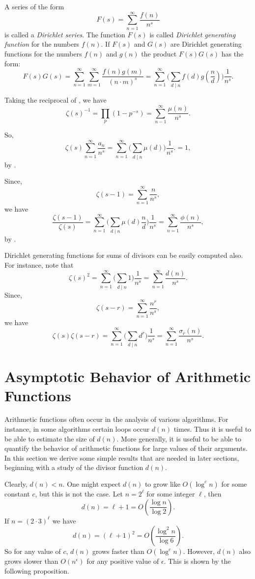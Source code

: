 \medskip
A series of the form
\[
F(s) = \sum_{n=1}^{\infty} \frac{f(n)}{n^s}
\]
is called a {\em Dirichlet series}.  The function $F(s)$ is called
{\em Dirichlet generating function} for the numbers $f(n)$.  If $F(s)$
and $G(s)$ are Dirichlet generating functions for the numbers $f(n)$
and $g(n)$ the product $F(s)G(s)$ has the form:
\[
F(s) G(s)
= \sum_{n=1}^{\infty}\sum_{m=1}^{\infty} \frac{f(n) g(m)}{(n \cdot m)^s}
= \sum_{n=1}^{\infty} 
    \biggl( \sum_{d \mid n} f(d) g(\frac{n}{d})\biggr) \frac{1}{n^s}.
\]

Taking the reciprocal of , we have
\[
\zeta(s)^{-1} = \prod_p\left(1 - p^{-s}\right) =
\sum_{n-1}^{\infty} \frac{\mu(n)}{n^s}.
\]

So,
\[
\zeta(s) \sum_{n=1}^{\infty} \frac{a_n}{n^s} = 
\sum_{n=1}^{\infty} \biggl( \sum_{d \mid n} \mu(d)\biggr) \frac{1}{n^s}.
= 1,
\]
by .

Since,
\[
\zeta(s-1) = \sum_{n=1}^{\infty}\frac{n}{n^s},
\]
we have
\[
\frac{\zeta(s-1)}{\zeta(s)} = 
\sum_{n=1}^{\infty} \biggl( \sum_{d \mid n} \mu(d) \frac{n}{d}\biggr)
\frac{1}{n^s}
= \sum_{n=1}^{\infty} \frac{\phi(n)}{n^s},
\]
by .

Dirichlet generating functions for sums of divisors can be easily
computed also.  For instance, note that
\[
\zeta(s)^2 = \sum_{n=1}^{\infty} \biggl( \sum_{d \mid n} 1\biggr) \frac{1}{n^s}
 = \sum_{n=1}^{\infty} \frac{d(n)}{n^s}.
\]
Since,
\[
\zeta(s -r ) = \sum_{n=1}^{\infty} \frac{n^r}{n^s},
\]
we have
\[
\zeta(s) \zeta(s-r) 
 = \sum_{n=1}^{\infty} \biggl( \sum_{d \mid n} d^r\biggr) \frac{1}{n^s}
 = \sum_{n=1}^{\infty} \frac{\sigma_r(n)}{n^s}.
\]


\section{Asymptotic Behavior of Arithmetic Functions}
\label{NT:Asymp:Arith:Sec}

Arithmetic functions often occur in the analysis of various
algorithms.  For instance, in some algorithms certain loops occur
$d(n)$ times.  Thus it is useful to be able to estimate the size of
$d(n)$.  More generally, it is useful to be able to quantify the
behavior of arithmetic functions for large values of their arguments.
In this section we derive some simple results that are needed in later
sections, beginning with a study of the divisor function $d(n)$.

Clearly, $d(n) < n$.  One might expect $d(n)$ to grow like
$O(\log^c n)$ for some constant $c$, but this is not the case.  Let $n
= 2^{\ell}$ for some integer $\ell$, then
\[
d(n) = \ell + 1 = O(\frac{\log n}{\log 2}).
\]
If $n = (2\cdot 3)^{\ell}$ we have
\[
d(n) = (\ell + 1)^2 = O(\frac{\log^2 n}{\log 6}).
\]
So for any value of $c$, $d(n)$ grows faster than $O(\log^c n)$.
However, $d(n)$ also grows slower than $O(n^{\epsilon})$ for any
positive value of $\epsilon$.  This is shown by the following
proposition. 

